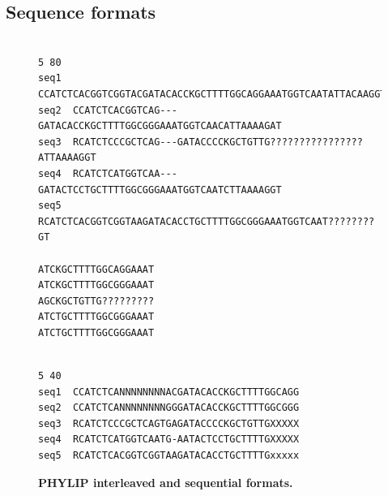 \documentclass[a4paper,12pt]{article}
\begin{document}
\subsection{Sequence formats}

\begin{figure}
\begin{small}
\begin{Verbatim}[frame=single, label=PHYLIP interleaved, samepage=true, baselinestretch=0.5]

5 80
seq1  CCATCTCACGGTCGGTACGATACACCKGCTTTTGGCAGGAAATGGTCAATATTACAAGGT
seq2  CCATCTCACGGTCAG---GATACACCKGCTTTTGGCGGGAAATGGTCAACATTAAAAGAT
seq3  RCATCTCCCGCTCAG---GATACCCCKGCTGTTG????????????????ATTAAAAGGT
seq4  RCATCTCATGGTCAA---GATACTCCTGCTTTTGGCGGGAAATGGTCAATCTTAAAAGGT
seq5  RCATCTCACGGTCGGTAAGATACACCTGCTTTTGGCGGGAAATGGTCAAT????????GT

ATCKGCTTTTGGCAGGAAAT
ATCKGCTTTTGGCGGGAAAT
AGCKGCTGTTG?????????
ATCTGCTTTTGGCGGGAAAT
ATCTGCTTTTGGCGGGAAAT

\end{Verbatim}
\begin{Verbatim}[frame=single, label=PHYLIP sequential, samepage=true, baselinestretch=0.5]

5 40
seq1  CCATCTCANNNNNNNNACGATACACCKGCTTTTGGCAGG
seq2  CCATCTCANNNNNNNNGGGATACACCKGCTTTTGGCGGG
seq3  RCATCTCCCGCTCAGTGAGATACCCCKGCTGTTGXXXXX
seq4  RCATCTCATGGTCAATG-AATACTCCTGCTTTTGXXXXX
seq5  RCATCTCACGGTCGGTAAGATACACCTGCTTTTGxxxxx

\end{Verbatim}
\end{small}
\label{fig:align_tree}
\caption{\bf PHYLIP interleaved and sequential formats.}
\end{figure}
\end{document}
